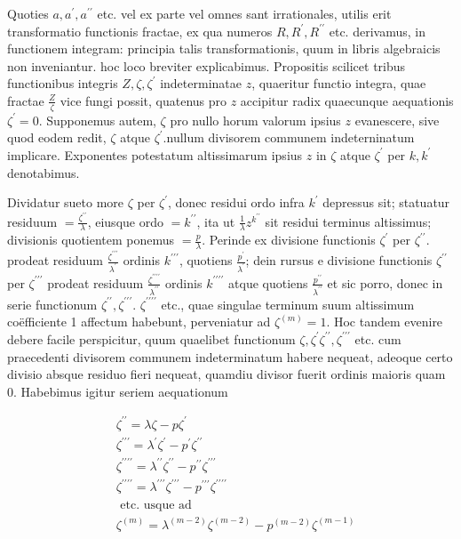 \documentclass[10pt]{article}
\begin{document}
Quoties \(a, a^{\prime}, a^{\prime \prime}\) etc. vel ex parte vel omnes sant irrationales, utilis erit transformatio functionis fractae, ex qua numeros \(R, R^{\prime}, R^{\prime \prime}\) etc. derivamus, in functionem integram: principia talis transformationis, quum in libris algebraicis non inveniantur. hoc loco breviter explicabimus. Propositis scilicet tribus functionibus integris \(Z, \zeta, \zeta^{\prime}\) indeterminatae \(z\), quaeritur functio integra, quae fractae \(\frac{Z}{\zeta}\) vice fungi possit, quatenus pro \(z\) accipitur radix quaecunque aequationis \(\zeta^{\prime}=0\). Supponemus autem, \(\zeta\) pro nullo horum valorum ipsius \(z\) evanescere, sive quod eodem redit, \(\zeta\) atque \(\zeta^{\prime}\).nullum divisorem communem indeterninatum implicare. Exponentes potestatum altissimarum ipsius \(z\) in \(\zeta\) atque \(\zeta^{\prime}\) per \(k, k^{\prime}\) denotabimus.

Dividatur sueto more \(\zeta\) per \(\zeta^{\prime}\), donec residui ordo infra \(k^{\prime}\) depressus sit; statuatur residuum \(=\frac{\zeta^{\prime \prime}}{\lambda}\), eiusque ordo \(=k^{\prime \prime}\), ita ut \(\frac{1}{\lambda} z^{k^{\prime \prime}}\) sit residui terminus altissimus; divisionis quotientem ponemus \(=\frac{p}{\lambda}\). Perinde ex divisione functionis \(\zeta^{\prime}\) per \(\zeta^{\prime \prime}\). prodeat residuum \(\frac{\zeta^{\prime \prime \prime}}{\lambda^{\prime}}\) ordinis \(k^{\prime \prime \prime}\), quotiens \(\frac{p^{\prime}}{\lambda^{\prime}}\); dein rursus e divisione functionis \(\zeta^{\prime \prime}\) per \(\zeta^{\prime \prime \prime}\) prodeat residuum \(\frac{\zeta^{\prime \prime \prime \prime}}{\lambda^{\prime \prime}}\) ordinis \(k^{\prime \prime \prime \prime}\) atque quotiens \(\frac{p^{\prime \prime}}{\lambda^{\prime \prime}}\) et sic porro, donec in serie functionum \(\zeta^{\prime \prime}, \zeta^{\prime \prime \prime}\). \(\zeta^{\prime \prime \prime \prime}\) etc., quae singulae terminum suum altissimum coëfficiente 1 affectum habebunt, perveniatur ad \(\zeta^{(m)}=1\). Hoc tandem evenire debere facile perspicitur, quum quaelibet functionum \(\zeta, \zeta^{\prime} \zeta^{\prime \prime}, \zeta^{\prime \prime \prime}\) etc. cum praecedenti divisorem communem indeterminatum habere nequeat, adeoque certo divisio absque residuo fieri nequeat, quamdiu divisor fuerit ordinis maioris quam 0. Habebimus igitur seriem aequationum

\[
\begin{aligned}
& \zeta^{\prime \prime}=\lambda \zeta-p \zeta^{\prime} \\
& \zeta^{\prime \prime \prime}=\lambda^{\prime} \zeta^{\prime}-p^{\prime} \zeta^{\prime \prime} \\
& \zeta^{\prime \prime \prime \prime}=\lambda^{\prime \prime} \zeta^{\prime \prime}-p^{\prime \prime} \zeta^{\prime \prime \prime} \\
& \zeta^{\prime \prime \prime \prime}=\lambda^{\prime \prime \prime} \zeta^{\prime \prime \prime}-p^{\prime \prime \prime} \zeta^{\prime \prime \prime \prime} \\
& \text { etc. usque ad } \\
& \zeta^{(m)}=\lambda^{(m-2)} \zeta^{(m-2)}-p^{(m-2)} \zeta^{(m-1)}
\end{aligned}
\]
\end{document}
